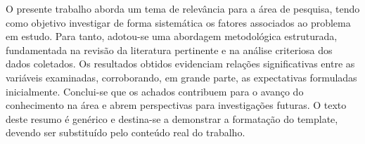 
O presente trabalho aborda um tema de relevância para a área de pesquisa, tendo como objetivo investigar de forma sistemática os fatores associados ao problema em estudo. Para tanto, adotou-se uma abordagem metodológica estruturada, fundamentada na revisão da literatura pertinente e na análise criteriosa dos dados coletados. Os resultados obtidos evidenciam relações significativas entre as variáveis examinadas, corroborando, em grande parte, as expectativas formuladas inicialmente. Conclui-se que os achados contribuem para o avanço do conhecimento na área e abrem perspectivas para investigações futuras. O texto deste resumo é genérico e destina-se a demonstrar a formatação do template, devendo ser substituído pelo conteúdo real do trabalho.

